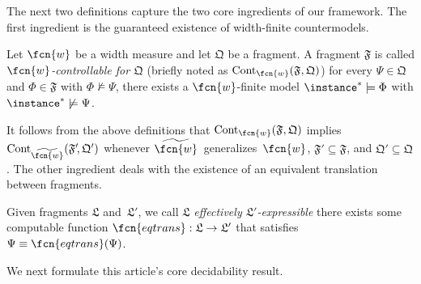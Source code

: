 \bigskip

The next two definitions capture the two core ingredients of our framework. The first ingredient is the guaranteed existence of width-finite countermodels.

\begin{definition}
Let $\fcn{w}$ be a width measure and let $\mathfrak{Q}$ be a fragment.
A fragment $\mathfrak{F}$ is called \emph{$\fcn{w}$-controllable for $\mathfrak{Q}$}  (briefly noted as $\mathrm{Cont}_\fcn{w}(\mathfrak{F},\mathfrak{Q})$) \iffi for every $\Psi \in \mathfrak{Q}$ and  $\Phi \in \mathfrak{F}$ with $\Phi \not \models \Psi$, there exists a $\fcn{w}$-finite model $\instance^* \models \Phi$ with $\instance^* \not\models \Psi$.
\end{definition}


It follows from the above definitions that  $\mathrm{Cont}_\fcn{w}(\mathfrak{F},\mathfrak{Q})$ implies $\mathrm{Cont}_{\widetilde{\fcn{w}}}(\mathfrak{F}'\!,\mathfrak{Q}')$ whenever 
$\widetilde{\fcn{w}}$~generalizes~$\fcn{w}$, $\mathfrak{F}'\! \subseteq \mathfrak{F}$, and $\mathfrak{Q}'\! \subseteq \mathfrak{Q}$.   
%
The other ingredient deals with the existence of an equivalent translation between fragments.

\begin{definition}
Given fragments $\mathfrak{L}$ and~$\mathfrak{L}'$, we call $\mathfrak{L}$ \emph{effectively $\mathfrak{L}'$-expressible} \iffi there exists some computable function $\fcn{eqtrans} : \mathfrak{L} \to \mathfrak{L}'$ that satisfies $\Psi \equiv \fcn{eqtrans}(\Psi)$. 
\end{definition}

We next formulate this article's core decidability result.


